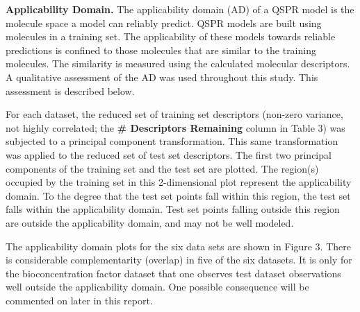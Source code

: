 \documentclass[10pt, letter]{article}
\renewcommand{\=}{\, =\, }
\newcommand{\+}{\, +\, }
\renewcommand{\-}{\, -\, }
\begin{document}
\textbf{Applicability Domain.} The applicability domain (AD) of a QSPR model is the molecule space a model can
reliably predict. QSPR models are built using molecules in a training set. The applicability of these models towards reliable predictions is confined to those molecules that are similar to the training molecules. The similarity is measured using the calculated molecular descriptors. A qualitative assessment of the AD was used throughout this study. This assessment is described below.

For each dataset, the reduced set of training set descriptors (non-zero variance, not highly correlated; the \textbf{\# Descriptors Remaining} column in Table 3) was subjected to a principal component transformation. This same transformation was applied to the reduced set of test set descriptors. The first two principal components of the training set and the test set are plotted. The region(s) occupied by the training set in this 2-dimensional plot represent the applicability domain. To the degree that the test set points fall within this region, the test set falls within the applicability domain. Test set points falling outside this region are outside the applicability domain, and may not be well modeled.

The applicability domain plots for the six data sets are shown in Figure 3. There is considerable complementarity (overlap) in five of the six datasets. It is only for the bioconcentration factor dataset that one observes test dataset observations well outside the applicability domain. One possible consequence will be commented on later in this report.
\end{document}
